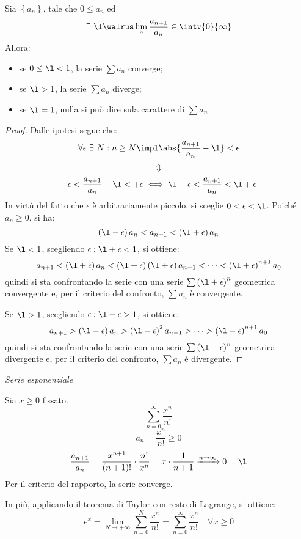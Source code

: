 \begin{theorem}
  Sia $\left\{ a_n \right\}$, tale che $0\le a_n$ ed
  $$\exists\ \l\walrus \lim_n\frac{a_{n+1}}{a_n}\in\intv{0}{\infty}$$
  Allora:
  \begin{itemize}
    \item se $0\le\l<1$, la serie $\sum a_n$ converge;
    \item se $\l>1$, la serie $\sum a_n$ diverge;
    \item se $\l=1$, nulla si può dire sula carattere di $\sum a_n$.
  \end{itemize}
\end{theorem}
\begin{proof}
  Dalle ipotesi segue che:
  $$\forall \epsilon\ \exists\ N:n\ge N\impl\abs{\frac{a_{n+1}}{a_n}-\l}<\epsilon$$
  $$\Updownarrow$$
  $$-\epsilon<\frac{a_{n+1}}{a_n}-\l<+\epsilon\iff\l-\epsilon<\frac{a_{n+1}}{a_n}<\l+\epsilon$$
  In virtù del fatto che $\epsilon$ è arbitrariamente piccolo, si sceglie $0<\epsilon<\l$.
  Poiché $a_n\ge0$, si ha:
  $$\left( \l-\epsilon \right)a_n<a_{n+1}<\left( \l+\epsilon \right)a_n$$
  Se $\l<1$, scegliendo $\epsilon:\l+\epsilon<1$, si ottiene: $$a_{n+1}<\left( \l+\epsilon \right)a_n<\left( \l+\epsilon \right)\left( \l+\epsilon \right)a_{n-1}<\cdots<\left( \l+\epsilon \right)^{n+1}a_0$$ quindi si sta confrontando la serie con una serie $\sum\left( \l+\epsilon \right)^n$ geometrica convergente e, per il criterio del confronto, $\sum a_n$ è convergente.
  
  \noindent Se $\l>1$, scegliendo $\epsilon:\l-\epsilon>1$, si ottiene: $$a_{n+1}>\left( \l-\epsilon \right)a_n>\left( \l-\epsilon \right)^2a_{n-1}>\cdots>\left( \l-\epsilon \right)^{n+1}a_0$$ quindi si sta confrontando la serie con una serie $\sum\left( \l-\epsilon \right)^n$ geometrica divergente e, per il criterio del confronto, $\sum a_n$ è divergente.
\end{proof}

\begin{example}
  \emph{Serie esponenziale}
  
  Sia $x\ge0$ fissato.
  $$\sum_{n=0}^\infty\frac{x^n}{n!}$$
  $$a_n=\frac{x^n}{n!}\ge0$$
  $$\frac{a_{n+1}}{a_n}=\frac{x^{n+1}}{\left( n+1 \right)!}\cdot \frac{n!}{x^n}=x\cdot\frac{1}{n+1}\xrightarrow{n\to\infty}0=\l$$
  Per il criterio del rapporto, la serie converge.
  
  In più, applicando il teorema di Taylor con resto di Lagrange, si ottiene:
  $$e^x=\lim_{N\to+\infty}\sum_{n=0}^N\frac{x^n}{n!}=\sum_{n=0}^\infty\frac{x^n}{n!}\quad \forall x\ge0$$
\end{example}

